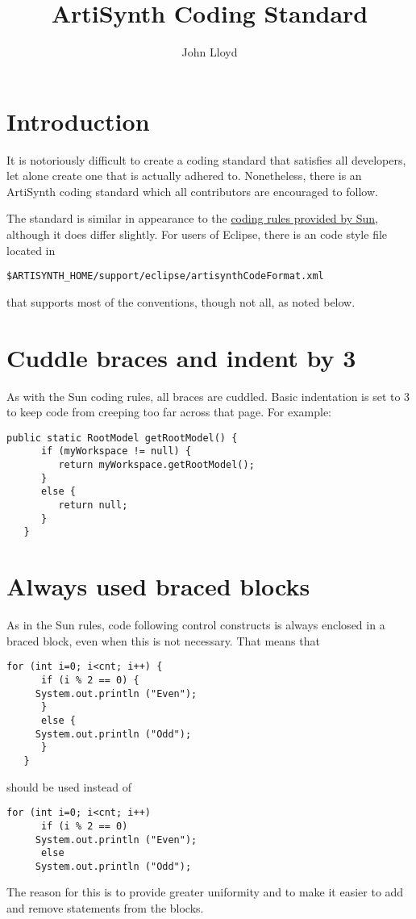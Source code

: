 \documentclass{article}
\title{ArtiSynth Coding Standard}
\author{John Lloyd}
\date{}
\begin{document}
\maketitle

\iflatexml{\large\pubdate}\fi

\tableofcontents

\section{Introduction}

It is notoriously difficult to create a coding standard that satisfies
all developers, let alone create one that is actually adhered to.
Nonetheless, there is an ArtiSynth coding standard which all
contributors are encouraged to follow.

The standard is similar in appearance to the
\href{http://java.sun.com/docs/codeconv}{coding rules provided by Sun},
although it does differ slightly. For users of Eclipse, there is an code
style file located in 
\begin{lstlisting}[]
 $ARTISYNTH_HOME/support/eclipse/artisynthCodeFormat.xml
\end{lstlisting}
that supports most of the conventions, though not all, as noted
below.

\section{Cuddle braces and indent by 3}

As with the Sun coding rules, all braces are cuddled. Basic indentation
is set to 3 to keep code from creeping too far across that page.
For example:
%
\begin{lstlisting}[]
   public static RootModel getRootModel() {
      if (myWorkspace != null) {
         return myWorkspace.getRootModel();
      }
      else {
         return null;
      }
   }
\end{lstlisting}

\section{Always used braced blocks}

As in the Sun rules, code following control constructs is always
enclosed in a braced block, even when this is not necessary. That
means that
%
\begin{lstlisting}[]
   for (int i=0; i<cnt; i++) {
      if (i % 2 == 0) {
	 System.out.println ("Even");
      }
      else {
	 System.out.println ("Odd");
      }
   }
\end{lstlisting}
should be used instead of
\begin{lstlisting}[]
   for (int i=0; i<cnt; i++)
      if (i % 2 == 0)
	 System.out.println ("Even");
      else
	 System.out.println ("Odd");
\end{lstlisting}
The reason for this is to provide greater uniformity and to
make it easier to add and remove statements from the blocks.
\end{document}
